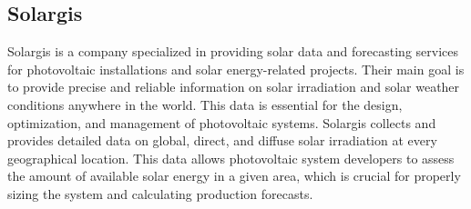 \subsection{Solargis} \label{sec:solargis}
Solargis is a company specialized in providing solar data and forecasting services for photovoltaic
installations and solar energy-related projects. Their main goal is to provide precise and
reliable information on solar irradiation and solar weather conditions anywhere in the world.
This data is essential for the design, optimization, and management of photovoltaic systems.
Solargis collects and provides detailed data on global, direct, and diffuse solar irradiation at
every geographical location. This data allows photovoltaic system developers to assess the
amount of available solar energy in a given area, which is crucial for properly sizing the
system and calculating production forecasts.


